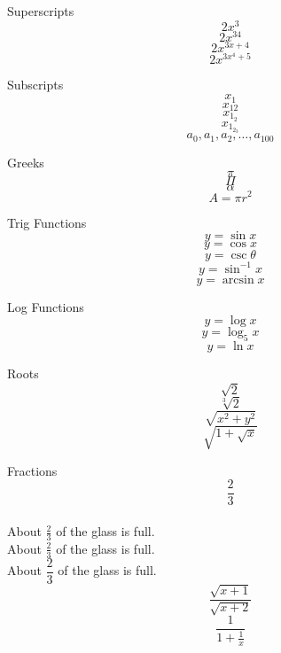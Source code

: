 \documentclass[11pt]{article}
\begin{document}
    Superscripts 
    \[ 2x^3 \] 
    \[ 2x^{34} \] 
    \[ 2x^{3x+4} \] 
    \[ 2x^{3x^4+5} \]
    
    Subscripts 
    \[ x_1 \] 
    \[ x_{12} \] 
    \[ x_{1_2} \]
    \[ x_{1_{2_3}} \]
    \[ a_0, a_1, a_2, \ldots, a_{100} \] %
    
    Greeks
    \[ \pi \]
    \[ \Pi \]
    \[ \alpha \]
    \[ A = \pi r^2 \]
    
    Trig Functions
    \[ y = \sin{x} \]
    \[ y = \cos{x} \]
    \[ y = \csc {\theta} \]
    \[ y = \sin^{-1} x \]
    \[ y = \arcsin x \]

    Log Functions
    \[ y = \log x \]
    \[ y = \log_5 x \]
    \[ y = \ln x \]

    Roots
    \[ \sqrt{2} \]
    \[ \sqrt[3]{2} \]
    \[ \sqrt{x^2+y^2} \] 
    \[ \sqrt{ 1 + \sqrt{x} } \]

    Fractions
    \[ \frac{2}{3} \] \\
    About $ \frac{2}{3} $ of the glass is full.\\[6pt] %
    About $ \displaystyle \frac{2}{3} $ of the glass is full.\\[6pt] %
    About $ \dfrac{2}{3} $ of the glass is full.\\[6pt] %
    \[ \frac{\sqrt{x+1}}{\sqrt{x+2}} \]
    \[ \frac{1}{1+\frac{1}{x}} \]
\end{document}
